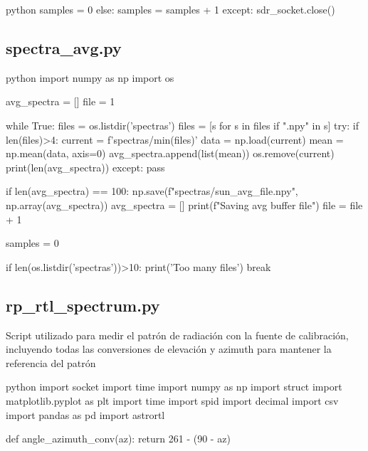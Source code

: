 \begin{appendixs}
\begin{sourcecode}[]{python}{}
            samples = 0
        else:
            samples = samples + 1
    except:
        sdr_socket.close()
\end{sourcecode}

\subsection{spectra\_avg.py}

\begin{sourcecode}[]{python}{}
    import numpy as np
    import os

    avg_spectra = []
    file = 1
    
    while True:
        files = os.listdir('spectras')
        files = [s for s in files if ".npy" in s]
        try:
            if len(files)>4:
                current = f'spectras/{min(files)}'
                data = np.load(current)
                mean = np.mean(data, axis=0)
                avg_spectra.append(list(mean))
                os.remove(current)
                print(len(avg_spectra))
        except: pass
            
        if len(avg_spectra) == 100:
            np.save(f"spectras/sun_avg_{file}.npy", np.array(avg_spectra))
            avg_spectra = []
            print(f"Saving avg buffer {file}")
            file = file + 1
    
            samples = 0
            
        if len(os.listdir('spectras'))>10:
            print('Too many files')
            break
            

\end{sourcecode}

\subsection{rp\_rtl\_spectrum.py}

Script utilizado para medir el patrón de radiación con la fuente de calibración, incluyendo todas las conversiones de elevación y azimuth para mantener la referencia del patrón



\begin{sourcecode}[]{python}{}
import socket
import time
import numpy as np
import struct
import matplotlib.pyplot as plt
import time
import spid
import decimal
import csv
import pandas as pd
import astrortl

def angle_azimuth_conv(az):
    return 261 - (90 - az)


\end{sourcecode}
\end{appendixs}
